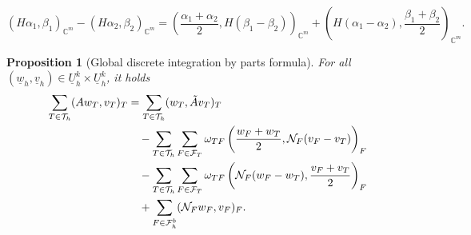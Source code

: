 \documentclass[10pt,a4paper]{amsart}
\newtheorem{proposition}{Proposition}
\newcommand{\Complex}{\mathbb{C}}
\newcommand{\FT}{\mathcal{F}_T}
\newcommand{\Fhb}{\mathcal{F}_h^{\rm b}}
\newcommand{\Th}{\mathcal{T}_h}
\newcommand{\Uh}{\underline{U}_h^k}
\begin{document}
\begin{equation}\label{eq:magic:algebraic}
  (H \alpha_1, \beta_1)_{\Complex^m} - (H \alpha_2, \beta_2)_{\Complex^m}
  = \left(\frac{\alpha_1 + \alpha_2}{2}, H(\beta_1 - \beta_2)\right)_{\Complex^m}
  + \left(H(\alpha_1 - \alpha_2), \frac{\beta_1 + \beta_2}{2}\right)_{\Complex^m}.
\end{equation}

\begin{proposition}[Global discrete integration by parts formula]\label{prop:ibp:global}
  For all $(\underline{w}_h, \underline{v}_h) \in \Uh \times \Uh$, it holds
  \begin{equation}\label{eq:ibp:global}
    \begin{aligned}
      \sum_{T \in \Th} (A w_T, v_T)_T
      &= \sum_{T \in \Th} (w_T, \tilde{A} v_T)_T
      \\
      &\quad
      - \sum_{T \in \Th} \sum_{F \in \FT} \omega_{TF} \left(\frac{w_F + w_T}{2}, \mathcal{N}_F (v_F - v_T)\right)_F
      \\
      &\quad
      - \sum_{T \in \Th} \sum_{F \in \FT} \omega_{TF}  \left(\mathcal{N}_F(w_F - w_T), \frac{v_F + v_T}{2}\right)_F
      \\
      &\quad
      + \sum_{F \in \Fhb} (\mathcal{N}_F w_F, v_F)_F.
    \end{aligned}
  \end{equation}
\end{proposition}
\end{document}
